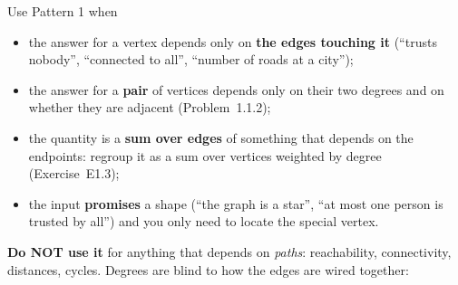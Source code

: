 Use Pattern 1 when
\begin{itemize}[leftmargin=*]
    \item the answer for a vertex depends only on \textbf{the edges touching it} (``trusts nobody'', ``connected to all'', ``number of roads at a city'');
    \item the answer for a \textbf{pair} of vertices depends only on their two degrees and on whether they are adjacent (Problem~1.1.2);
    \item the quantity is a \textbf{sum over edges} of something that depends on the endpoints: regroup it as a sum over vertices weighted by degree (Exercise~E1.3);
    \item the input \textbf{promises} a shape (``the graph is a star'', ``at most one person is trusted by all'') and you only need to locate the special vertex.
\end{itemize}

\textbf{Do NOT use it} for anything that depends on \emph{paths}: reachability, connectivity, distances, cycles. Degrees are blind to how the edges are wired together:

\begin{diagrambox}
\end{diagrambox}

